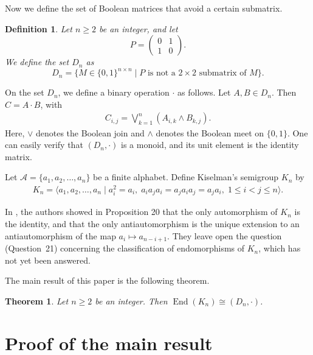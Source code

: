 \documentclass[pdflatex,sn-mathphys-num]{sn-jnl}%
\theoremstyle{thmstyleone}%
\newtheorem{theorem}{Theorem}%
\theoremstyle{thmstyletwo}%
\theoremstyle{thmstylethree}%
\newtheorem{definition}{Definition}%
\begin{document}
Now we define the set of Boolean matrices that avoid a certain submatrix.

\begin{definition}\label{Dn}
   Let $n \geq 2$ be an integer, and let
   \begin{equation}\label{pattern}
      P = 
      \begin{pmatrix}
         0 & 1 \\
         1 & 0
      \end{pmatrix}.
   \end{equation}
   We define the set $D_n$ as 
   \[
      D_n = \{ M \in \{0, 1\}^{n \times n} \mid P \text{ is not a } 2 \times 2 \text{ submatrix of } M \}.
   \]
\end{definition}

On the set $D_n$, we define a binary operation $\cdot$ as follows. Let $A, B \in D_n$. Then $C = A \cdot B$, with
\begin{align*}
   C_{i, j} = \bigvee_{k=1}^n (A_{i, k} \land B_{k, j}).
\end{align*}
Here, $\lor$ denotes the Boolean join and $\land$ denotes the Boolean meet on $\{0, 1\}$. One can easily verify that $(D_n, \cdot)$ is a monoid, and its unit element is the identity matrix. 

Let $\mathcal{A} = \{a_1, a_2, \dots , a_n\}$ be a finite alphabet. Define Kiselman's semigroup $K_n$ by
\begin{align*}
   K_n = \langle a_1, a_2, \dots, a_n \mid a_i^2 = a_i, \; a_i a_j a_i = a_j a_i a_j = a_j a_i, \; 1 \leq i < j \leq n \rangle .
\end{align*}

In \cite{GK}, the authors showed in Proposition 20 that the only automorphism of $K_n$ is the identity, and that the only antiautomorphism is the unique extension to an antiautomorphism of the map 
$a_i \mapsto a_{n-i+1}$. They leave open the question (Question~21) concerning the classification of endomorphisms of $K_n$, which has not yet been answered.

The main result of this paper is the following theorem.
\begin{theorem}\label{thm:main}
   Let $n \geq 2$ be an integer. Then $\operatorname{End}(K_n) \cong (D_n, \cdot)$.
\end{theorem}

\section{Proof of the main result}
\end{document}
